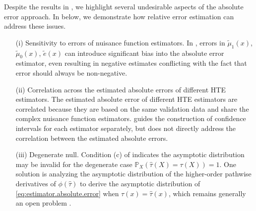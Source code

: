 \documentclass{article}
\theoremstyle{plain}
\theoremstyle{definition}
\def\PP{\mathbb{P}}
\theoremstyle{plain}
\begin{document}
Despite the results in , we highlight several undesirable aspects of the absolute error approach. In  below, we demonstrate how relative error estimation can address these issues.
\begin{itemize}
    \item [(i)] Sensitivity to errors of nuisance function estimators. 
    In , errors in $\tilde{\mu}_1(x)$, $\tilde{\mu}_0(x)$, $\tilde{e}(x)$ can introduce significant bias into the absolute error estimator, even resulting in negative estimates conflicting with the fact that error should always be non-negative. 
    
    \item [(ii)] Correlation across the estimated absolute errors of different HTE estimators.
    The estimated absolute error of different HTE estimators are correlated because they are based on the same validation data and share the complex nuisance function estimators.
     guides the construction of confidence intervals for each estimator separately, but does not directly address the correlation between the estimated absolute errors.

    \item [(iii)] Degenerate null. Condition (c) of  indicates the asymptotic distribution may be invalid for the degenerate case $\PP_X(\hat{\tau}(X) = \tau(X)) = 1$. 
    One solution is analyzing the asymptotic distribution of the higher-order pathwise derivatives of $\phi(\hat{\tau})$ to derive the asymptotic distribution of \eqref{eq:estimator.absolute.error} when $\tau(x) = \hat{\tau}(x)$, which remains generally an open problem \parencite{hines2022variable, hudson2023nonparametric}.

\end{itemize}
\end{document}
